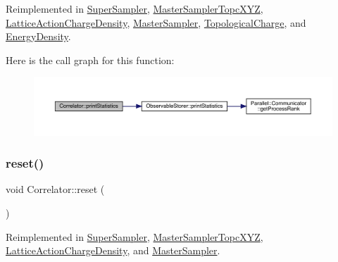 Reimplemented in \mbox{\hyperlink{class_super_sampler_a04b230314ae446c77172c97ff52cf4f3}{Super\+Sampler}}, \mbox{\hyperlink{class_master_sampler_topc_x_y_z_a5a34a7f90ce8eea6c0efa06cfdfeb5f1}{Master\+Sampler\+Topc\+X\+YZ}}, \mbox{\hyperlink{class_lattice_action_charge_density_abdaa497dd70dee58b810de7315241a56}{Lattice\+Action\+Charge\+Density}}, \mbox{\hyperlink{class_master_sampler_a9accfc83c05d3013396355e40257a562}{Master\+Sampler}}, \mbox{\hyperlink{class_topological_charge_ad56263921d283d315b04ab40c9594a2c}{Topological\+Charge}}, and \mbox{\hyperlink{class_energy_density_ad108e32bc670f17f15b4ed433d8bbec7}{Energy\+Density}}.

Here is the call graph for this function\+:\nopagebreak
\begin{figure}[H]
\begin{center}
\leavevmode
\includegraphics[width=350pt]{class_correlator_a2168d677f547769784781d2e2aaa53cf_cgraph}
\end{center}
\end{figure}
\mbox{\label{class_correlator_aacca40262d2cd62f0a3964e832f948c1}} 
\subsubsection{\texorpdfstring{reset()}{reset()}}
{\footnotesize\ttfamily void Correlator\+::reset (\begin{DoxyParamCaption}{ }\end{DoxyParamCaption})\hspace{0.3cm}{\ttfamily [virtual]}}



Reimplemented in \mbox{\hyperlink{class_super_sampler_ab2f028561e015500fac1e3093aa4a725}{Super\+Sampler}}, \mbox{\hyperlink{class_master_sampler_topc_x_y_z_aef8d0b1b431711c6410cfece1c007b4a}{Master\+Sampler\+Topc\+X\+YZ}}, \mbox{\hyperlink{class_lattice_action_charge_density_aebbc2cc72334e7b33d9cce2ad469280b}{Lattice\+Action\+Charge\+Density}}, and \mbox{\hyperlink{class_master_sampler_a275a032513db03c899056fd07d71cc89}{Master\+Sampler}}.

